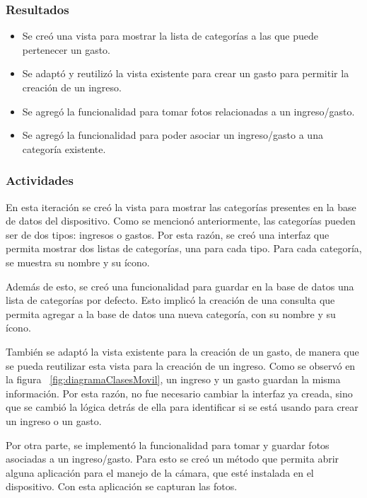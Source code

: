 \subsubsection{Resultados}
\begin{itemize}
\item Se creó una vista para mostrar la lista de categorías a las que puede pertenecer un gasto.
\item Se adaptó y reutilizó la vista existente para crear un gasto para permitir la creación de un ingreso.
\item Se agregó la funcionalidad para tomar fotos relacionadas a un ingreso/gasto.
\item Se agregó la funcionalidad para poder asociar un ingreso/gasto a una categoría existente.

\end{itemize}

\subsubsection{Actividades}

En esta iteración se creó la vista para mostrar las categorías presentes en la base de datos del dispositivo. Como se mencionó anteriormente, las categorías pueden ser de dos tipos: ingresos o gastos. Por esta razón, se creó una interfaz que permita mostrar dos listas de categorías, una para cada tipo. Para cada categoría, se muestra su nombre y su ícono.

Además de esto, se creó una funcionalidad para guardar en la base de datos una lista de categorías por defecto. Esto implicó la creación de una consulta que permita agregar a la base de datos una nueva categoría, con su nombre y su ícono.

También se adaptó la vista existente para la creación de un gasto, de manera que se pueda reutilizar esta vista para la creación de un ingreso. Como se observó en la figura ~\ref{fig:diagramaClasesMovil}, un ingreso y un gasto guardan la misma información. Por esta razón, no fue necesario cambiar la interfaz ya creada, sino que se cambió la lógica detrás de ella para identificar si se está usando para crear un ingreso o un gasto.

Por otra parte, se implementó la funcionalidad para tomar y guardar fotos asociadas a un ingreso/gasto. Para esto se creó un método que permita abrir alguna aplicación para el manejo de la cámara, que esté instalada en el dispositivo. Con esta aplicación se capturan las fotos. 

